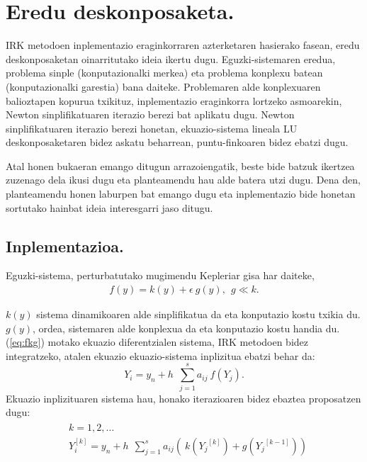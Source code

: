 \section{Eredu deskonposaketa.}


IRK metodoen inplementazio eraginkorraren azterketaren hasierako fasean, eredu deskonposaketan oinarritutako ideia ikertu dugu. Eguzki-sistemaren eredua, problema sinple (konputazionalki merkea) eta problema konplexu batean (konputazionalki garestia) bana daiteke.   
Problemaren alde konplexuaren balioztapen kopurua txikituz, inplementazio eraginkorra lortzeko asmoarekin, Newton sinplifikatuaren iterazio berezi bat aplikatu dugu. Newton sinplifikatuaren iterazio berezi honetan, ekuazio-sistema lineala LU deskonposaketaren bidez askatu beharrean, puntu-finkoaren bidez ebatzi dugu.

Atal honen bukaeran emango ditugun arrazoiengatik, beste bide batzuk ikertzea zuzenago dela ikusi dugu eta planteamendu hau alde batera utzi dugu. Dena den, planteamendu honen laburpen bat emango dugu eta inplementazio bide honetan sortutako hainbat ideia interesgarri jaso ditugu.

\subsection*{Inplementazioa.}
Eguzki-sistema, perturbatutako mugimendu Kepleriar gisa har daiteke,  
\begin{align}
\label{eq:fkg}
 f(y)=  k(y) + \epsilon \ g (y), \ \ g\ll k.   
\end{align}
 
$k(y)$ sistema dinamikoaren alde sinplifikatua da eta konputazio kostu txikia du. $g(y)$, ordea, sistemaren alde konplexua da eta konputazio kostu handia du. (\ref{eq:fkg}) motako ekuazio diferentzialen sistema, IRK metodoen bidez integratzeko, atalen ekuazio ekuazio-sistema inplizitua ebatzi behar da: 
\begin{equation*}
Y_i=y_n+h\ \ \sum^s_{j=1}{a_{ij} \ f({Y_j}) }. 
\end{equation*} 
%
Ekuazio inplizituaren sistema hau, honako iterazioaren bidez ebaztea proposatzen dugu:
\begin{align}
\begin{split}
&k=1,2,\dots \\
&Y_i^{[k]}=y_n+h\ \ \sum^s_{j=1}{a_{ij}(\ k({Y_j}^{[k]})+g({Y_j}^{[k-1]})) }
\end{split}
\end{align}

